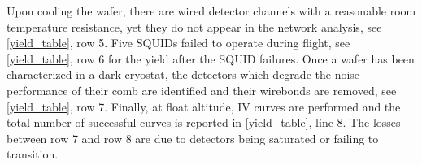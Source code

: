 \documentclass[../EBEXPaper2.tex]{subfiles}
\begin{document}
Upon cooling the wafer, there are wired detector channels with a reasonable room temperature resistance, yet they do not appear in the network analysis, see \TAB\ref{yield_table}, row 5. Five \ac{SQUID}s failed to operate during flight, see \TAB\ref{yield_table}, row 6 for the yield after the \ac{SQUID} failures. 
Once a wafer has been characterized in a dark cryostat, the detectors which degrade the noise performance of their comb are identified and their wirebonds are removed, see \TAB\ref{yield_table}, row 7. 
Finally, at float altitude, IV curves are performed and the total number of successful curves is reported in \TAB\ref{yield_table}, line 8. The losses between row 7 and row 8 are due to detectors being saturated or failing to transition. %




%
\end{document}
